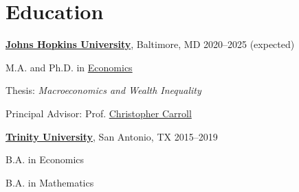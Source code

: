 
\section{Education}
\href{https://www.jhu.edu}{\textbf{Johns Hopkins University}}, Baltimore, MD \hfill 2020--2025 (expected)
\begin{outerlist}
	\item M.A. and Ph.D.  in \href{https://econ.jhu.edu} {Economics}
	 \item Thesis: \textit{Macroeconomics and Wealth Inequality}
	  {\item Principal Advisor: Prof. \href{https://econ.jhu.edu/directory/christopher-carroll/}{Christopher Carroll} 
	}
\end{outerlist}


\vspace{0.1in}
\href{https://www.trinity.edu}{\textbf{Trinity University}}, San Antonio, TX \hfill 2015--2019
\begin{outerlist}
        \item B.A. in Economics
        \item B.A. in Mathematics 
\end{outerlist}
